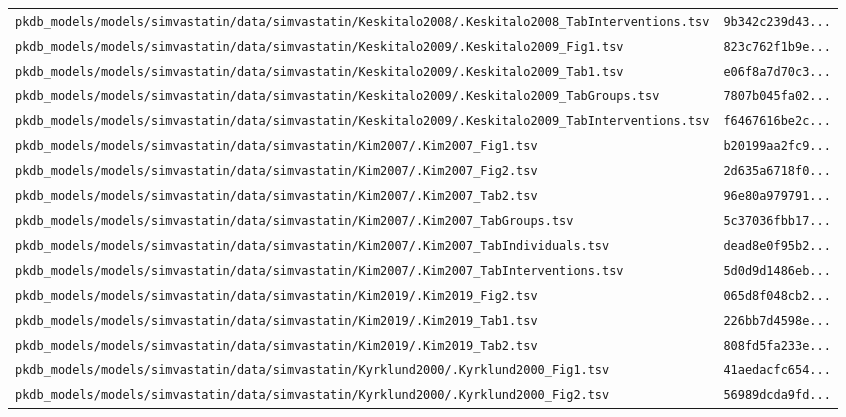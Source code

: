 \begin{longtable}{ll}
\texttt{pkdb\_models/models/simvastatin/data/simvastatin/Keskitalo2008/.Keskitalo2008\_TabInterventions.tsv} & \texttt{9b342c239d43...} \\
\texttt{pkdb\_models/models/simvastatin/data/simvastatin/Keskitalo2009/.Keskitalo2009\_Fig1.tsv} & \texttt{823c762f1b9e...} \\
\texttt{pkdb\_models/models/simvastatin/data/simvastatin/Keskitalo2009/.Keskitalo2009\_Tab1.tsv} & \texttt{e06f8a7d70c3...} \\
\texttt{pkdb\_models/models/simvastatin/data/simvastatin/Keskitalo2009/.Keskitalo2009\_TabGroups.tsv} & \texttt{7807b045fa02...} \\
\texttt{pkdb\_models/models/simvastatin/data/simvastatin/Keskitalo2009/.Keskitalo2009\_TabInterventions.tsv} & \texttt{f6467616be2c...} \\
\texttt{pkdb\_models/models/simvastatin/data/simvastatin/Kim2007/.Kim2007\_Fig1.tsv} & \texttt{b20199aa2fc9...} \\
\texttt{pkdb\_models/models/simvastatin/data/simvastatin/Kim2007/.Kim2007\_Fig2.tsv} & \texttt{2d635a6718f0...} \\
\texttt{pkdb\_models/models/simvastatin/data/simvastatin/Kim2007/.Kim2007\_Tab2.tsv} & \texttt{96e80a979791...} \\
\texttt{pkdb\_models/models/simvastatin/data/simvastatin/Kim2007/.Kim2007\_TabGroups.tsv} & \texttt{5c37036fbb17...} \\
\texttt{pkdb\_models/models/simvastatin/data/simvastatin/Kim2007/.Kim2007\_TabIndividuals.tsv} & \texttt{dead8e0f95b2...} \\
\texttt{pkdb\_models/models/simvastatin/data/simvastatin/Kim2007/.Kim2007\_TabInterventions.tsv} & \texttt{5d0d9d1486eb...} \\
\texttt{pkdb\_models/models/simvastatin/data/simvastatin/Kim2019/.Kim2019\_Fig2.tsv} & \texttt{065d8f048cb2...} \\
\texttt{pkdb\_models/models/simvastatin/data/simvastatin/Kim2019/.Kim2019\_Tab1.tsv} & \texttt{226bb7d4598e...} \\
\texttt{pkdb\_models/models/simvastatin/data/simvastatin/Kim2019/.Kim2019\_Tab2.tsv} & \texttt{808fd5fa233e...} \\
\texttt{pkdb\_models/models/simvastatin/data/simvastatin/Kyrklund2000/.Kyrklund2000\_Fig1.tsv} & \texttt{41aedacfc654...} \\
\texttt{pkdb\_models/models/simvastatin/data/simvastatin/Kyrklund2000/.Kyrklund2000\_Fig2.tsv} & \texttt{56989dcda9fd...} \\

\end{longtable}

